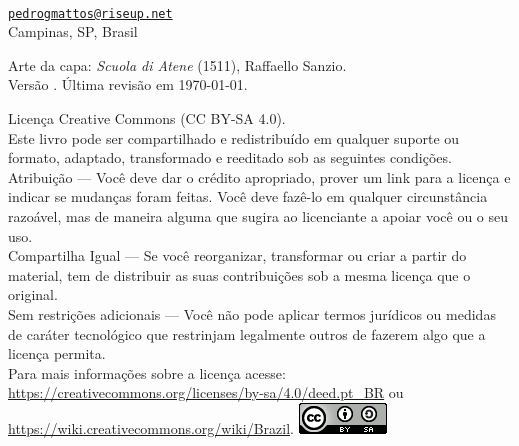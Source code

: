 \thispagestyle{empty}

\noindent
\autor \\
\href{mailto:pedrogmattos@riseup.net}{\texttt{pedrogmattos@riseup.net}}\\
Campinas, SP, Brasil

\vfill

\noindent Arte da capa: \textit{Scuola di Atene} (1511), Raffaello Sanzio.
\vspace*{0.5cm}\\
Versão \versao. Última revisão em \today.
\vspace*{0.5cm}\\
\begin{small}
\noindent
\ccLogo{} Licença Creative Commons (CC BY-SA 4.0).\\
Este livro pode ser compartilhado e redistribuído em qualquer suporte ou formato, adaptado, transformado e reeditado sob as seguintes condições.\\
Atribuição --- Você deve dar o crédito apropriado, prover um link para a licença e indicar se mudanças foram feitas. Você deve fazê-lo em qualquer circunstância razoável, mas de maneira alguma que sugira ao licenciante a apoiar você ou o seu uso.\\
Compartilha Igual --- Se você reorganizar, transformar ou criar a partir do material, tem de distribuir as suas contribuições sob a mesma licença que o original.\\
Sem restrições adicionais --- Você não pode aplicar termos jurídicos ou medidas de caráter tecnológico que restrinjam legalmente outros de fazerem algo que a licença permita.\\
Para mais informações sobre a licença acesse:\\
\url{https://creativecommons.org/licenses/by-sa/4.0/deed.pt_BR} ou\\
\url{https://wiki.creativecommons.org/wiki/Brazil}. \hfill
\includegraphics[height=\baselineskip]{./imagens/licensa.png}
\end{small}
